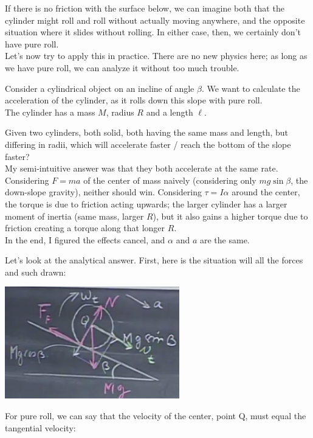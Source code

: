 \documentclass[8.01x]{subfiles}
\begin{document}
If there is no friction with the surface below, we can imagine both that the cylinder might roll and roll without actually moving anywhere, and the opposite situation where it slides without rolling. In either case, then, we certainly don't have pure roll.\\
Let's now try to apply this in practice. There are no new physics here; as long as we have pure roll, we can analyze it without too much trouble.

Consider a cylindrical object on an incline of angle $\beta$. We want to calculate the acceleration of the cylinder, as it rolls down this slope with pure roll.\\
The cylinder has a mass $M$, radius $R$ and a length $\ell$.

Given two cylinders, both solid, both having the same mass and length, but differing in radii, which will accelerate faster / reach the bottom of the slope faster?\\
My semi-intuitive answer was that they both accelerate at the same rate. Considering $F = ma$ of the center of mass naively (considering only $m g \sin \beta$, the down-slope gravity), neither should win. Considering $\tau = I \alpha$ around the center, the torque is due to friction acting upwards; the larger cylinder has a larger moment of inertia (same mass, larger $R$), but it also gains a higher torque due to friction creating a torque along that longer $R$.\\
In the end, I figured the effects cancel, and $\alpha$ and $a$ are the same.

Let's look at the analytical answer. First, here is the situation will all the forces and such drawn:

\begin{center}
\includegraphics[scale=0.75]{Graphics/lec24_cylinder_roll}
\end{center}

For pure roll, we can say that the velocity of the center, point Q, must equal the tangential velocity:
\end{document}
